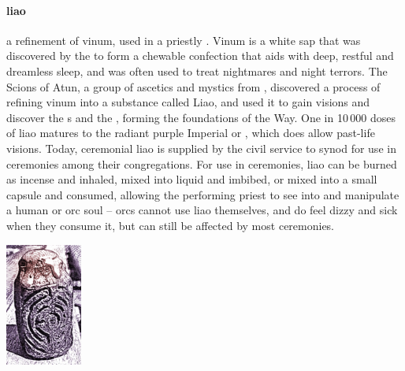 \paragraph{liao} a refinement of vinum, used in a priestly . Vinum is a white sap that was discovered by the  to form a chewable confection that aids with deep, restful and dreamless sleep, and was often used to treat nightmares and night terrors. The Scions of Atun, a group of ascetics and mystics from , discovered a process of refining vinum into a substance called Liao, and used it to gain visions and discover the s and the , forming the foundations of the Way. One in 10\,000 doses of liao matures to the radiant purple Imperial or , which does allow past-life visions. \localpar Today, ceremonial liao is supplied by the civil service to synod  for use in ceremonies among their congregations. For use in ceremonies, liao can be burned as incense and inhaled, mixed into liquid and imbibed, or mixed into a small capsule and consumed, allowing the performing priest to see into and manipulate a human or orc soul – orcs cannot use liao themselves, and do feel dizzy and sick when they consume it, but can still be affected by most ceremonies.\begin{center}\includegraphics[width=2.52cm]{encyclopedia/Liao}\end{center}
